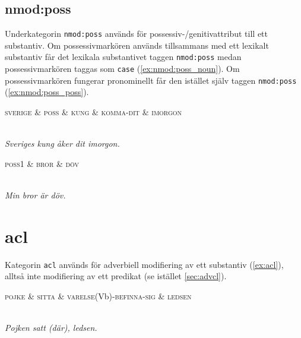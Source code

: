 \documentclass[11pt,a4paper]{article}
\begin{document}
\subsection{nmod:poss}
\label{subsec:nmod:poss}
Underkategorin \texttt{nmod:poss} används för possessiv-/genitivattribut till ett substantiv. Om possessivmarkören används tillsammans med ett lexikalt substantiv får det lexikala substantivet taggen \texttt{nmod:poss} medan possessivmarkören taggas som \texttt{case} (\ref{ex:nmod:poss_noun}). Om possessivmarkören fungerar pronominellt får den istället själv taggen \texttt{nmod:poss} (\ref{ex:nmod:poss_poss}).

\begin{example}
\label{ex:nmod:poss_noun}
\begin{dependency}[theme = simple]
   \begin{deptext}[column sep=1em]
      \textsc{sverige} \& \textsc{poss} \& \textsc{kung} \& \textsc{komma-dit} \& \textsc{imorgon} \\
   \end{deptext}
\end{dependency}
\\
\textit{Sveriges kung åker dit imorgon.}
\end{example}

\begin{example}
\label{ex:nmod:poss_poss}
\begin{dependency}[theme = simple]
   \begin{deptext}[column sep=1em]
      \textsc{poss1} \& \textsc{bror} \& \textsc{döv} \\
   \end{deptext}
\end{dependency}
\\
\textit{Min bror är döv.}
\end{example}

\section{acl}
Kategorin \texttt{acl} används för adverbiell modifiering av ett substantiv (\ref{ex:acl}), alltså inte modifiering av ett predikat (se istället \ref{sec:advcl}).

\begin{example}
\label{ex:acl}
\begin{dependency}[theme = simple]
   \begin{deptext}[column sep=1em]
      \textsc{pojke} \& \textsc{sitta} \& \textsc{varelse}(Vb)-\textsc{befinna-sig} \& \textsc{ledsen} \\
   \end{deptext}
\end{dependency}
\\
\textit{Pojken satt (där), ledsen.}
\end{example}
\end{document}
